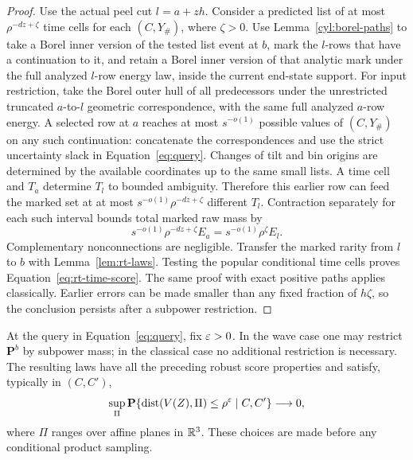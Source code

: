 \begin{proof}
Use the actual peel cut $l=a+zh$.  Consider a predicted list of at
most $\rho^{-dz+\zeta}$ time cells for each $(C,Y_\#)$, where
$\zeta>0$.  Use Lemma~\ref{cyl:borel-paths} to take a Borel inner
version of the tested list event at $b$, mark the $l$-rows that have
a continuation to it, and retain a Borel inner version of that
analytic mark under the full analyzed $l$-row energy law, inside
the current end-state support. For input restriction,
take the Borel outer hull of all predecessors under the
unrestricted truncated $a$-to-$l$ geometric correspondence, with
the same full analyzed $a$-row energy. A selected row at $a$ reaches at most
$s^{-o(1)}$ possible values of $(C,Y_\#)$ on any such
continuation: concatenate the correspondences and use the strict
uncertainty slack in Equation~\eqref{eq:query}.  Changes of tilt
and bin origins are determined by the available coordinates up to
the same small lists.  A time cell and $T_a$ determine $T_l$ to
bounded ambiguity.  Therefore this earlier row can feed the marked
set at at most $s^{-o(1)}\rho^{-dz+\zeta}$ different $T_l$.
Contraction separately for each such interval bounds total marked
raw mass by
\[
 s^{-o(1)}\rho^{-dz+\zeta}E_a
       =s^{-o(1)}\rho^\zeta E_l.
\]
Complementary nonconnections are negligible.  Transfer the marked
rarity from $l$ to $b$ with Lemma~\ref{lem:rt-laws}.
Testing the popular conditional time cells proves
Equation~\eqref{eq:rt-time-score}.  The same proof with exact
positive paths applies classically.  Earlier errors can be made
smaller than any fixed fraction of $h\zeta$, so the conclusion
persists after a subpower restriction.
\end{proof}

\begin{lemma}
\label{lem:rt-slab-removal}
At the query in Equation~\eqref{eq:query}, fix $\varepsilon>0$.
In the wave case one may restrict $\mathbf P^b$ by subpower mass;
in the classical case no additional restriction is necessary.
The resulting laws have all the preceding robust score properties
and satisfy, typically in $(C,C')$,
\begin{equation}\label{eq:rt-plane-nonconcentration}
 \sup_{\Pi}\mathbf P\{\operatorname{dist}(V(Z),\Pi)\le\rho^\varepsilon
                         \mid C,C'\}\longrightarrow0,
\end{equation}
where $\Pi$ ranges over affine planes in $\mathbb R^3$.
These choices are made before any conditional product sampling.
\end{lemma}

